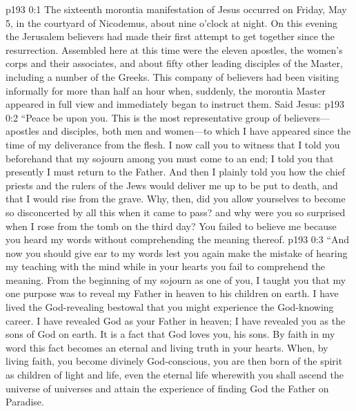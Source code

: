 \author{Midwayer Commission}
\vs p193 0:1 The sixteenth morontia manifestation of Jesus occurred on Friday, May 5, in the courtyard of Nicodemus, about nine o’clock at night. On this evening the Jerusalem believers had made their first attempt to get together since the resurrection. Assembled here at this time were the eleven apostles, the women’s corps and their associates, and about fifty other leading disciples of the Master, including a number of the Greeks. This company of believers had been visiting informally for more than half an hour when, suddenly, the morontia Master appeared in full view and immediately began to instruct them. Said Jesus:
\pc \vs p193 0:2 \textcolor{ubdarkred}{“Peace be upon you. This is the most representative group of believers---apostles and disciples, both men and women---to which I have appeared since the time of my deliverance from the flesh. I now call you to witness that I told you beforehand that my sojourn among you must come to an end; I told you that presently I must return to the Father. And then I plainly told you how the chief priests and the rulers of the Jews would deliver me up to be put to death, and that I would rise from the grave. Why, then, did you allow yourselves to become so disconcerted by all this when it came to pass? and why were you so surprised when I rose from the tomb on the third day? You failed to believe me because you heard my words without comprehending the meaning thereof.}
\vs p193 0:3 \textcolor{ubdarkred}{“And now you should give ear to my words lest you again make the mistake of hearing my teaching with the mind while in your hearts you fail to comprehend the meaning. From the beginning of my sojourn as one of you, I taught you that my one purpose was to reveal my Father in heaven to his children on earth. I have lived the God\hyp{}revealing bestowal that you might experience the God\hyp{}knowing career. I have revealed God as your Father in heaven; I have revealed you as the sons of God on earth. It is a fact that God loves you, his sons. By faith in my word this fact becomes an eternal and living truth in your hearts. When, by living faith, you become divinely God\hyp{}conscious, you are then born of the spirit as children of light and life, even the eternal life wherewith you shall ascend the universe of universes and attain the experience of finding God the Father on Paradise.}
